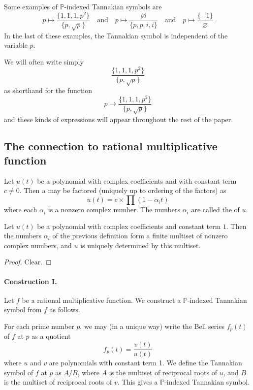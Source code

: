 \documentclass[a4paper]{article}
\begin{document}
\begin{example}
Some examples of $\mathbb{P}$-indexed Tannakian symbols are
$$ p \mapsto \frac{   \{  1,1, 1, p^2  \}   }{  \{  p, \sqrt{p}  \}   } \quad \textrm{and} \quad p \mapsto \frac{   \varnothing   }{  \{  p, p, i, i  \}   }   \quad \textrm{and} \quad p \mapsto \frac{  \{ -1  \}   }{     \varnothing }    $$
In the last of these examples, the Tannakian symbol is independent of the variable $p$. 
\end{example}

We will often write simply
$$  \frac{   \{  1,1, 1, p^2  \}   }{  \{  p, \sqrt{p}  \}   }$$
as shorthand for the function
$$ p \mapsto \frac{   \{  1,1, 1, p^2  \}   }{  \{  p, \sqrt{p}  \}   } $$
and these kinds of expressions will appear throughout the rest of the paper.

\subsection{The connection to rational multiplicative function}

\begin{definition}
Let $u(t)$ be a polynomial with complex coefficients and with constant term $c \neq 0$. Then $u$ may be factored (uniquely up to ordering of the factors) as 
$$  u(t) =  c \times \prod(1 - \alpha_i t)  $$
where each $\alpha_i$ is a nonzero complex number. The numbers $\alpha_i$ are called the  of $u$.
\end{definition}

\begin{lemma}
Let $u(t)$ be a polynomial with complex coefficients and constant term $1$. Then the numbers $\alpha_i$ of the previous definition form a finite multiset of nonzero complex numbers, and $u$ is uniquely determined by this multiset.
\end{lemma}
\begin{proof}
Clear.
\end{proof}

\paragraph{Construction I.} Let $f$ be a rational multiplicative function. We construct a $\mathbb{P}$-indexed Tannakian symbol from $f$ as follows.

For each prime number $p$, we may (in a unique way) write the Bell series $f_p(t)$ of $f$ at $p$ as a quotient
$$ f_p(t) = \frac{v(t)}{u(t) }   $$
where $u$ and $v$ are polynomials with constant term 1. We define the Tannakian symbol of $f$ at $p$ as $A/B$, where $A$ is the multiset of reciprocal roots of $u$, and $B$ is the multiset of reciprocal roots of $v$. This gives a $\mathbb{P}$-indexed Tannakian symbol.
\end{document}
